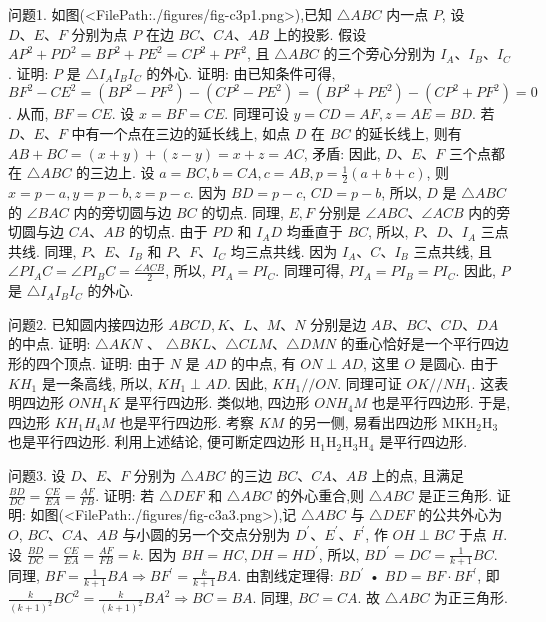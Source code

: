 
问题1. 如图(<FilePath:./figures/fig-c3p1.png>),已知 $\triangle A B C$ 内一点 $P$, 设 $D 、 E 、 F$ 分别为点 $P$ 在边 $B C 、 C A 、 A B$ 上的投影.
假设 $A P^2+ P D^2=B P^2+P E^2=C P^2+P F^2$, 且 $\triangle A B C$ 的三个旁心分别为 $I_A 、 I_B 、 I_C$. 证明: $P$ 是 $\triangle I_A I_B I_C$ 的外心.
证明: 由已知条件可得, $B F^2-C E^2=\left(B P^2-P F^2\right)-\left(C P^2-P E^2\right)= \left(B P^2+P E^2\right)-\left(C P^2+P F^2\right)=0$. 从而, $B F=C E$. 设 $x=B F=C E$. 同理可设 $y=C D=A F, z=A E=B D$. 若 $D 、 E 、 F$ 中有一个点在三边的延长线上, 如点 $D$ 在 $B C$ 的延长线上, 则有 $A B+B C=(x+y)+(z-y)=x+z=A C$, 矛盾: 因此, $D 、 E 、 F$ 三个点都在 $\triangle A B C$ 的三边上.
设 $a=B C, b=C A, c= A B, p=\frac{1}{2}(a+b+c)$, 则 $x=p-a, y=p-b, z=p-c$. 因为 $B D=p-c$, $C D=p-b$, 所以, $D$ 是 $\triangle A B C$ 的 $\angle B A C$ 内的旁切圆与边 $B C$ 的切点.
同理, $E, F$ 分别是 $\angle A B C 、 \angle A C B$ 内的旁切圆与边 $C A 、 A B$ 的切点.
由于 $P D$ 和 $I_A D$ 均垂直于 $B C$, 所以, $P 、 D 、 I_A$ 三点共线.
同理, $P 、 E 、 I_B$ 和 $P 、 F 、 I_C$ 均三点共线.
因为 $I_A 、 C 、 I_B$ 三点共线, 且 $\angle P I_A C=\angle P I_B C=\frac{\angle A C B}{2}$,
所以, $P I_A=P I_C$. 同理可得, $P I_A=P I_B=P I_C$. 因此, $P$ 是 $\triangle I_A I_B I_C$ 的外心.



问题2. 已知圆内接四边形 $A B C D, K 、 L 、 M 、 N$ 分别是边 $A B 、 B C 、 C D 、 D A$ 的中点.
证明: $\triangle A K N$ 、 $\triangle B K L 、 \triangle C L M 、 \triangle D M N$ 的垂心恰好是一个平行四边形的四个顶点.
证明: 由于 $N$ 是 $A D$ 的中点, 有 $O N \perp A D$, 这里 $O$ 是圆心.
由于 $K H_1$ 是一条高线, 所以, $K H_1 \perp A D$. 因此, $K H_1 / / O N$. 同理可证 $O K / / N H_1$. 这表明四边形 $O N H_1 K$ 是平行四边形.
类似地, 四边形 $O N H_4 M$ 也是平行四边形.
于是, 四边形 $K H_1 H_4 M$ 也是平行四边形.
考察 $K M$ 的另一侧, 易看出四边形 $\mathrm{MKH}_2 \mathrm{H}_3$ 也是平行四边形.
利用上述结论, 便可断定四边形 $\mathrm{H}_1 \mathrm{H}_2 \mathrm{H}_3 \mathrm{H}_4$ 是平行四边形.



问题3. 设 $D 、 E 、 F$ 分别为 $\triangle A B C$ 的三边 $B C 、 C A 、 A B$ 上的点, 且满足 $\frac{B D}{D C}=\frac{C E}{E A}=\frac{A F}{F B}$. 证明: 若 $\triangle D E F$ 和 $\triangle A B C$ 的外心重合,则 $\triangle A B C$ 是正三角形.
证明: 如图(<FilePath:./figures/fig-c3a3.png>),记 $\triangle A B C$ 与 $\triangle D E F$ 的公共外心为 $O$, $B C 、 C A 、 A B$ 与小圆的另一个交点分别为 $D^{\prime} 、 E^{\prime} 、 F^{\prime}$, 作 $O H \perp B C$ 于点 $H$. 设 $\frac{B D}{D C}=\frac{C E}{E A}=\frac{A F}{F B}=k$. 因为 $B H= H C, D H=H D^{\prime}$, 所以, $B D^{\prime}=D C=\frac{1}{k+1} B C$. 同理, $B F=\frac{1}{k+1} B A \Rightarrow B F^{\prime}=\frac{k}{k+1} B A$. 由割线定理得: $B D^{\prime}$ •
$B D=B F \cdot B F^{\prime}$, 即 $\frac{k}{(k+1)^2} B C^2=\frac{k}{(k+1)^2} B A^2 \Rightarrow B C= B A$. 同理, $B C=C A$. 故 $\triangle A B C$ 为正三角形.



